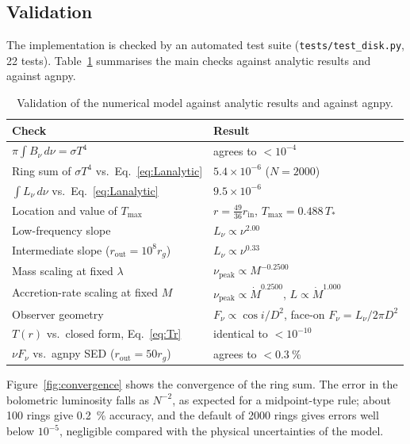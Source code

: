 \documentclass[11pt,a4paper]{article}
\newcommand{\Mdot}{\dot M}
\newcommand{\rin}{r_{\mathrm{in}}}
\newcommand{\rout}{r_{\mathrm{out}}}
\newcommand{\Tmax}{T_{\max}}
\newcommand{\nupk}{\nu_{\mathrm{peak}}}
\newcommand{\rg}{r_{g}}
\begin{document}
\subsection{Validation}\label{sec:validation}
The implementation is checked by an automated test suite
(\texttt{tests/test\_disk.py}, 22 tests). Table~\ref{tab:validation}
summarises the main checks against analytic results and against agnpy.

\begin{table}[H]
  \centering
  \caption{Validation of the numerical model against analytic results and
  against agnpy.}
  \label{tab:validation}
  \begin{tabular}{@{}ll@{}}
    \toprule
    Check & Result \\
    \midrule
    $\pi\int B_\nu\,d\nu=\sigma T^4$ & agrees to $<10^{-4}$ \\
    Ring sum of $\sigma T^4$ vs.\ Eq.~\eqref{eq:Lanalytic} & $5.4\times10^{-6}$ ($N=2000$) \\
    $\int L_\nu\,d\nu$ vs.\ Eq.~\eqref{eq:Lanalytic} & $9.5\times10^{-6}$ \\
    Location and value of $\Tmax$ & $r=\tfrac{49}{36}\rin$, $\Tmax=0.488\,T_*$ \\
    Low-frequency slope & $L_\nu\propto\nu^{2.00}$ \\
    Intermediate slope ($\rout=10^8\rg$) & $L_\nu\propto\nu^{0.33}$ \\
    Mass scaling at fixed $\lambda$ & $\nupk\propto M^{-0.2500}$ \\
    Accretion-rate scaling at fixed $M$ & $\nupk\propto\Mdot^{0.2500}$, $L\propto\Mdot^{1.000}$ \\
    Observer geometry & $F_\nu\propto\cos i/D^2$, face-on $F_\nu=L_\nu/2\pi D^2$ \\
    $T(r)$ vs.\ closed form, Eq.~\eqref{eq:Tr} & identical to $<10^{-10}$ \\
    $\nu F_\nu$ vs.\ agnpy SED ($\rout=50\rg$) & agrees to $<\SI{0.3}{\percent}$ \\
    \bottomrule
  \end{tabular}
\end{table}

Figure~\ref{fig:convergence} shows the convergence of the ring sum. The
error in the bolometric luminosity falls as $N^{-2}$, as expected for a
midpoint-type rule; about 100 rings give \SI{0.2}{\percent} accuracy, and
the default of 2000 rings gives errors well below $10^{-5}$, negligible
compared with the physical uncertainties of the model.
\end{document}
